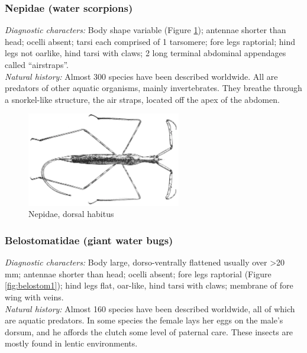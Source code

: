 \documentclass[letterpaper, 11pt]{article}
\begin{document}
\subsubsection{Nepidae (water scorpions)}
\noindent{}\textit{Diagnostic characters:} Body shape variable (Figure \ref{fig:nepid1}); antennae shorter than head; ocelli absent; tarsi each comprised of 1 tarsomere; fore legs raptorial; hind legs not oarlike, hind tarsi with claws; 2 long terminal abdominal appendages called ``airstraps''.\\

\noindent{}\textit{Natural history:} Almost 300 species have been described worldwide. All are predators of other aquatic organisms, mainly invertebrates. They breathe through a snorkel-like structure, the air straps, located off the apex of the abdomen.\\

\begin{figure}[ht!]
 \centering
 \includegraphics[width=0.6\textwidth]{nepid.png}
 \caption{Nepidae, dorsal habitus \citep[Modified from Fig. 7:19 in][]{bhlitem126080aquatic}}
 \label{fig:nepid1}
\end{figure}

\subsubsection{Belostomatidae (giant water bugs)}
\noindent{}\textit{Diagnostic characters:} Body large, dorso-ventrally flattened usually over \textgreater20 mm; antennae shorter than head; ocelli absent; fore legs raptorial (Figure \ref{fig:belostom1}); hind legs flat, oar-like, hind tarsi with claws; membrane of fore wing with veins.\\

\noindent{}\textit{Natural history:} Almost 160 species have been described worldwide, all of which are aquatic predators. In some species the female lays her eggs on the male's dorsum, and he affords the clutch some level of paternal care. These insects are mostly found in lentic environments.\\
\end{document}
